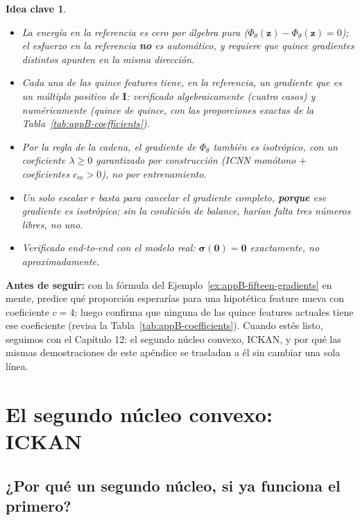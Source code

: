 \documentclass[11pt,a4paper]{article}
\newtheorem{takeaway}{Idea clave}
\begin{document}
\begin{takeaway}
\begin{itemize}
\item La energ\'ia en la referencia es cero por \'algebra pura
($\Phi_\theta(\bm z)-\Phi_\theta(\bm z)=0$); el esfuerzo en la
referencia \textbf{no} es autom\'atico, y requiere que quince
gradientes distintos apunten en la misma direcci\'on.
\item Cada una de las quince features tiene, en la referencia, un
gradiente que es un m\'ultiplo positivo de $\bm I$: verificado
algebraicamente (cuatro casos) y num\'ericamente (quince de quince,
con las proporciones exactas de la Tabla~\ref{tab:appB-coefficients}).
\item Por la regla de la cadena, el gradiente de $\Phi_\theta$ tambi\'en
es isotr\'opico, con un coeficiente $\lambda\geq0$ garantizado por
construcci\'on (ICNN mon\'otono $+$ coeficientes $c_m>0$), no por
entrenamiento.
\item Un solo escalar $r$ basta para cancelar el gradiente completo,
\textbf{porque} ese gradiente es isotr\'opico; sin la condici\'on de
balance, har\'ian falta tres n\'umeros libres, no uno.
\item Verificado end-to-end con el modelo real: $\bm\sigma(\bm0)=\bm0$
exactamente, no aproximadamente.
\end{itemize}
\end{takeaway}

\bigskip
\noindent\textbf{Antes de seguir:} con la f\'ormula del Ejemplo~\ref{ex:appB-fifteen-gradients}
en mente, predice qu\'e proporci\'on esperar\'ias para una
hipot\'etica feature nueva con coeficiente $c=4$; luego confirma que
ninguna de las quince features actuales tiene ese coeficiente (revisa
la Tabla~\ref{tab:appB-coefficients}). Cuando est\'es listo, seguimos
con el Cap\'itulo 12: el segundo n\'ucleo convexo, ICKAN, y por qu\'e
las mismas demostraciones de este ap\'endice se trasladan a \'el sin
cambiar una sola l\'inea.

\section{El segundo n\'ucleo convexo: ICKAN}
\label{ch:ickan}

\subsection{¿Por qu\'e un segundo n\'ucleo, si ya funciona el primero?}
\end{document}
